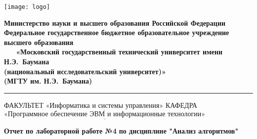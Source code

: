   \thispagestyle{empty}
  \begin{titlepage}
      \noindent \begin{minipage}{0.15\textwidth}
      \texttt{[image: logo]}
      \end{minipage}
      \noindent\begin{minipage}{0.9\textwidth}\centering
          \textbf{Министерство науки и высшего образования Российской Федерации}\\
          \textbf{Федеральное государственное бюджетное образовательное учреждение высшего образования}\\
          \textbf{~~~«Московский государственный технический университет имени Н.Э.~Баумана}\\
          \textbf{(национальный исследовательский университет)»}\\
          \textbf{(МГТУ им. Н.Э.~Баумана)}
      \end{minipage}
      
      \noindent\rule{18cm}{3pt}
      \newline\newline
      \noindent ФАКУЛЬТЕТ $\underline{\text{«Информатика и системы управления»}}$ \newline\newline
      \noindent КАФЕДРА $\underline{\text{«Программное обеспечение ЭВМ и информационные технологии»}}$\newline\newline\newline\newline\newline\newline\newline\newline\newline\newline\newline
      
      
      \begin{center}
          \noindent\begin{minipage}{1.3\textwidth}\centering
              \Large\textbf{  Отчет по лабораторной работе №4}\newline
              \textbf{по дисциплине "Анализ алгоритмов"}\newline\newline
          \end{minipage}
      \end{center}
      

\end{titlepage}
